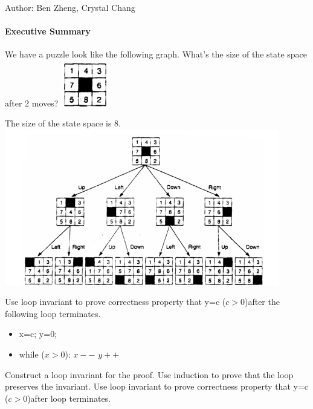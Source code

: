 \documentclass[solution, letterpaper]{cs20inclass}
\begin{document}

\noindent Author: Ben Zheng, Crystal Chang

\paragraph*{Executive Summary}

\problem We have a puzzle look like the following graph. What's the size of the state space after 2 moves?
\includegraphics[width=2cm]{initial}

\begin{solution}
The size of the state space is 8.\\
\includegraphics[width=12cm]{final8}
\end{solution}

\problem Use loop invariant to prove correctness property that y=c ($c>0$)after the following loop terminates.
\begin{itemize}
\item x=c; y=0;
\item while ($x>0$):
\subitem $x--$
\subitem $y++$
\end{itemize}
\subproblem Construct a loop invariant for the proof.
\subproblem Use induction to prove that the loop preserves the invariant.
\subproblem Use loop invariant to prove correctness property that y=c ($c>0$)after loop terminates.
\end{document}
